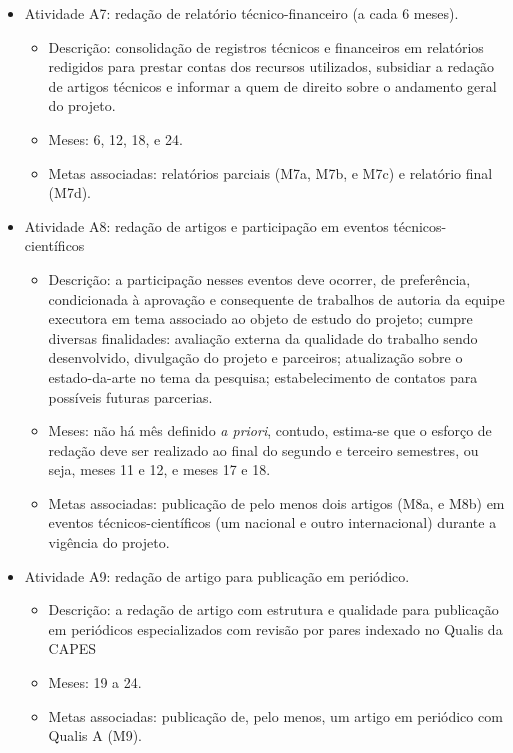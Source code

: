 \begin{itemize}
\begin{itemize}
	\end{itemize}
	\item Atividade A7: redação de relatório técnico-financeiro (a cada 6 meses).
	\begin{itemize}
		\item Descrição: consolidação de registros técnicos e financeiros em relatórios redigidos para prestar contas dos recursos utilizados, subsidiar a redação de artigos técnicos e informar a quem de direito sobre o andamento geral do projeto.
		\item Meses: 6, 12, 18, e 24.
		\item Metas associadas: relatórios parciais (M7a, M7b, e M7c) e relatório final (M7d).
	\end{itemize}
	\item  Atividade A8: redação de artigos e participação em eventos técnicos-científicos
	\begin{itemize}
		\item Descrição: a participação nesses eventos deve ocorrer, de preferência, condicionada à aprovação e consequente de trabalhos de autoria da equipe executora em tema associado ao objeto de estudo do projeto; cumpre diversas finalidades: avaliação externa da qualidade do trabalho sendo desenvolvido, divulgação do projeto e parceiros; atualização sobre o estado-da-arte no tema da pesquisa; estabelecimento de contatos para possíveis futuras parcerias.
		\item Meses: não há mês definido \emph{a priori}, contudo, estima-se que o esforço de redação deve ser realizado ao final do segundo e terceiro semestres, ou seja, meses 11 e 12, e meses 17 e 18.
		\item Metas associadas: publicação de pelo menos dois artigos (M8a, e M8b) em eventos técnicos-científicos (um nacional e outro internacional) durante a vigência do projeto.
	\end{itemize}
	\item Atividade A9: redação de artigo para publicação em periódico.
	\begin{itemize}
		\item Descrição: a redação de artigo com estrutura e qualidade para publicação em periódicos especializados com revisão por pares indexado no Qualis da CAPES
		\item Meses: 19 a 24.
		\item Metas associadas: publicação de, pelo menos, um artigo em periódico com Qualis A (M9).
	\end{itemize}
\end{itemize}

